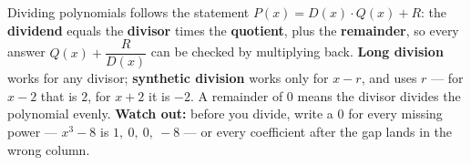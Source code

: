 \documentclass[12pt]{article}
\begin{document}
\vspace{0.14in}

\boxguard[8]
\begin{remindbox}
\small
Dividing polynomials follows the statement $P(x) = D(x)\cdot Q(x) + R$: the
\textbf{dividend} equals the \textbf{divisor} times the \textbf{quotient}, plus the
\textbf{remainder}, so every answer $Q(x) + \dfrac{R}{D(x)}$ can be checked by multiplying back.
\textbf{Long division} works for any divisor; \textbf{synthetic division} works only for
$x - r$, and uses $r$ --- for $x - 2$ that is $2$, for $x + 2$ it is $-2$. A remainder of $0$
means the divisor divides the polynomial evenly. \textbf{Watch out:} before you divide, write a
$0$ for every missing power --- $x^3 - 8$ is $1,\ 0,\ 0,\ -8$ --- or every coefficient after
the gap lands in the wrong column.
\end{remindbox}
\end{document}
